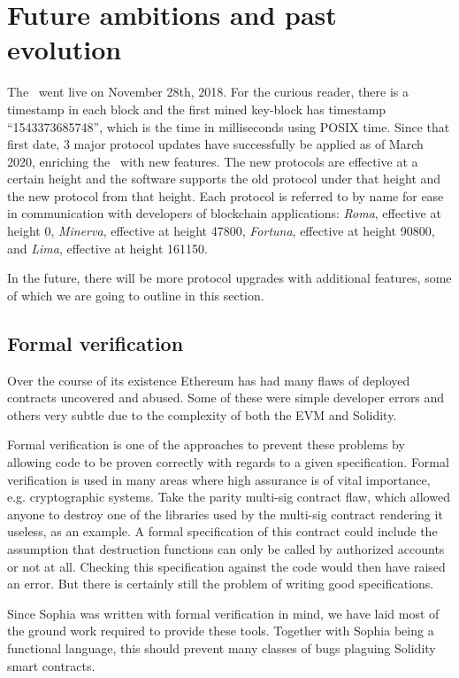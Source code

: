 \section{Future ambitions and past evolution}

The \blockchain\ went live on November 28th, 2018. For the curious reader,
there is a timestamp in each block and the first mined key-block has timestamp
``1543373685748'', which is the time in milliseconds using POSIX time. Since
that first date, 3 major protocol updates have successfully be applied as of
March 2020,
enriching the \blockchain\ with new features. The new protocols are effective
at a certain height and the software supports the old protocol under that
height and the new protocol from that height. Each protocol is referred to by
name for ease in communication with developers of blockchain applications:
\textit{Roma}, effective at height 0, \textit{Minerva}, effective at height
47800, \textit{Fortuna}, effective at height 90800, and \textit{Lima},
effective at height 161150.

In the future, there will be more protocol upgrades with additional features,
some of which we are going to outline in this section.

\subsection{Formal verification}

Over the course of its existence Ethereum has had many flaws of deployed
contracts uncovered and abused. Some of these were simple developer errors and
others very subtle due to the complexity of both the EVM and Solidity.

Formal verification is one of the approaches to prevent these problems by
allowing code to be proven correctly with regards to a given specification.
Formal verification is used in many areas where high assurance is of vital
importance, e.g. cryptographic systems.
Take the parity multi-sig contract flaw, which allowed anyone to destroy one of
the libraries used by the multi-sig contract rendering it useless, as an
example. A formal specification of this contract could include the assumption
that destruction functions can only be called by authorized accounts or not at
all. Checking this specification against the code would then have raised an
error. But there is certainly still the problem of writing good specifications.

Since Sophia was written with formal verification in mind, we have laid most of
the ground work required to provide these tools. Together with Sophia being a
functional language, this should prevent many classes of bugs plaguing Solidity
smart contracts.


